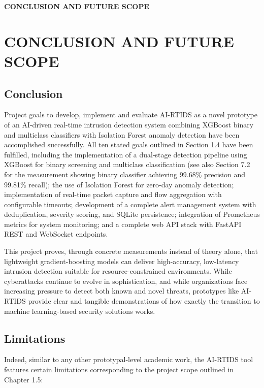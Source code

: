 \documentclass[12pt,a4paper]{report}
\newcommand{\chapterdivider}[1]{%
    \clearpage
    \thispagestyle{empty}
    \vspace*{\fill}
    \begin{center}
        \Huge\bfseries\color{mydarkblue} #1
    \end{center}
    \vspace*{\fill}
    \clearpage
}
\begin{document}
\chapterdivider{CONCLUSION AND FUTURE SCOPE}

\chapter{CONCLUSION AND FUTURE SCOPE}

\section{Conclusion}

Project goals to develop, implement and evaluate AI-RTIDS as a novel prototype of an AI-driven real-time intrusion detection system combining XGBoost binary and multiclass classifiers with Isolation Forest anomaly detection have been accomplished successfully. All ten stated goals outlined in Section 1.4 have been fulfilled, including the implementation of a dual-stage detection pipeline using XGBoost for binary screening and multiclass classification (see also Section 7.2 for the measurement showing binary classifier achieving 99.68\% precision and 99.81\% recall); the use of Isolation Forest for zero-day anomaly detection; implementation of real-time packet capture and flow aggregation with configurable timeouts; development of a complete alert management system with deduplication, severity scoring, and SQLite persistence; integration of Prometheus metrics for system monitoring; and a complete web API stack with FastAPI REST and WebSocket endpoints.

This project proves, through concrete measurements instead of theory alone, that lightweight gradient-boosting models can deliver high-accuracy, low-latency intrusion detection suitable for resource-constrained environments. While cyberattacks continue to evolve in sophistication, and while organizations face increasing pressure to detect both known and novel threats, prototypes like AI-RTIDS provide clear and tangible demonstrations of how exactly the transition to machine learning-based security solutions works.

\section{Limitations}

Indeed, similar to any other prototypal-level academic work, the AI-RTIDS tool features certain limitations corresponding to the project scope outlined in Chapter 1.5:
\end{document}

